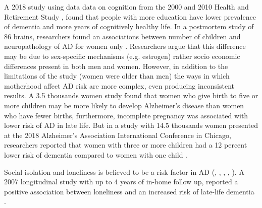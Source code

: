 \documentclass[11pt]{article}
\theoremstyle{definition}
\theoremstyle{remark}
\begin{document}
A 2018 study using data data on cognition from the 2000 and 2010 Health and Retirement Study \cite{crimmins2018educational}, found that people with more education have lower prevalence of dementia and more years of cognitively healthy life. In a postmortem study of 86 brains, researchers found an associations between number of children and neuropathology of AD for women only \cite{beeri2009number}. Researchers argue that this difference may be due to sex-specific mechanisms (e.g. estrogen) rather socio economic differences present in both men and women. However, in addition to the limitations of the study (women were older than men) the ways in which motherhood affect AD risk are more complex, even producing inconsistent results. A 3.5 thousands women study \cite{jang2018differential} found that women who give birth to five or more children may be more likely to develop Alzheimer's disease than women who have fewer births, furthermore, incomplete pregnancy was associated with lower risk of AD in late life. But in a study with 14.5 thousands women presented at the 2018 Alzheimer’s Association International Conference in Chicago, researchers reported that women with three or more children had a 12 percent lower risk of dementia compared to women with one child \cite{AAIC2018}.

Social isolation and loneliness is believed to be a risk factor in AD (\cite{holmen1992loneliness}, \cite{fratiglioni2000influence}, \cite{shankar2013social}, \cite{holwerda2014feelings}, \cite{evans2018social}). A 2007 longitudinal study with up to 4 years of in-home follow up, reported a positive association between loneliness and an increased risk of late-life dementia \cite{wilson2007loneliness}. 
\end{document}
